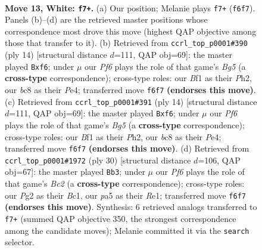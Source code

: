 \documentclass[11pt]{article}
\begin{document}
\clearpage

\begin{figure}[p]\centering
\begin{subfigure}{0.46\textwidth}\centering
\resizebox{\linewidth}{!}{%
\newchessgame
\chessboard[
  setfen={rnb1k2r/1ppn4/4pP2/p2p3p/N2P3q/8/PPP2NPP/R2QKB1R w KQkq - 0 13},
  showmover=false,
  pgfstyle=straightmove, color=movearrow, markmove={f6-f7}
]}
\caption{}
\end{subfigure}\hfill
\begin{subfigure}{0.46\textwidth}\centering
\resizebox{\linewidth}{!}{%
\newchessgame
\chessboard[
  setfen={rnb1kb1r/pp3ppp/4pn2/q5B1/2pNP3/2N5/PP3PPP/R2QKB1R w KQkq - 1 8},
  showmover=false,
  pgfstyle=straightmove, color=movearrow, markmove={g5-f6}
]}
\caption{}
\end{subfigure}
\\[4pt]
\begin{subfigure}{0.46\textwidth}\centering
\resizebox{\linewidth}{!}{%
\newchessgame
\chessboard[
  setfen={rnb1kb1r/pp3ppp/4pn2/q5B1/2pNP3/2N5/PP3PPP/R2QKB1R w KQkq - 1 8},
  showmover=false,
  pgfstyle=straightmove, color=movearrow, markmove={g5-f6}
]}
\caption{}
\end{subfigure}\hfill
\begin{subfigure}{0.46\textwidth}\centering
\resizebox{\linewidth}{!}{%
\newchessgame
\chessboard[
  setfen={2r1k2r/pp1nbppp/4pn2/1P5q/8/P4N2/1PB2PPP/R1BQR1K1 w k - 7 16},
  showmover=false,
  pgfstyle=straightmove, color=movearrow, markmove={c2-b3}
]}
\caption{}
\end{subfigure}
\caption{\textbf{Move 13, White: \texttt{f7+}.} (a) Our position; Melanie plays \texttt{f7+} (\texttt{f6f7}). Panels (b)--(d) are the retrieved master positions whose correspondence most drove this move (highest QAP objective among those that transfer to it). (b) Retrieved from \texttt{ccrl\_top\_p0001\#390} (ply 14) [structural distance $d$=111, QAP obj=69]: the master played \texttt{Bxf6}; under $\mu$ our \emph{Pf6} plays the role of that game's \emph{Bg5} (a \textbf{cross-type} correspondence); cross-type roles: our \emph{B}f1 as their \emph{P}h2, our \emph{b}c8 as their \emph{P}e4; transferred move \texttt{f6f7} \textbf{(endorses this move)}. (c) Retrieved from \texttt{ccrl\_top\_p0001\#391} (ply 14) [structural distance $d$=111, QAP obj=69]: the master played \texttt{Bxf6}; under $\mu$ our \emph{Pf6} plays the role of that game's \emph{Bg5} (a \textbf{cross-type} correspondence); cross-type roles: our \emph{B}f1 as their \emph{P}h2, our \emph{b}c8 as their \emph{P}e4; transferred move \texttt{f6f7} \textbf{(endorses this move)}. (d) Retrieved from \texttt{ccrl\_top\_p0001\#1972} (ply 30) [structural distance $d$=106, QAP obj=67]: the master played \texttt{Bb3}; under $\mu$ our \emph{Pf6} plays the role of that game's \emph{Bc2} (a \textbf{cross-type} correspondence); cross-type roles: our \emph{P}g2 as their \emph{B}c1, our \emph{p}a5 as their \emph{R}e1; transferred move \texttt{f6f7} \textbf{(endorses this move)}. Synthesis: 6 retrieved analogs transferred to \texttt{f7+} (summed QAP objective 350, the strongest correspondence among the candidate moves); Melanie committed it via the \texttt{search} selector.}
\label{fig:thought-m24}
\end{figure}
\end{document}
